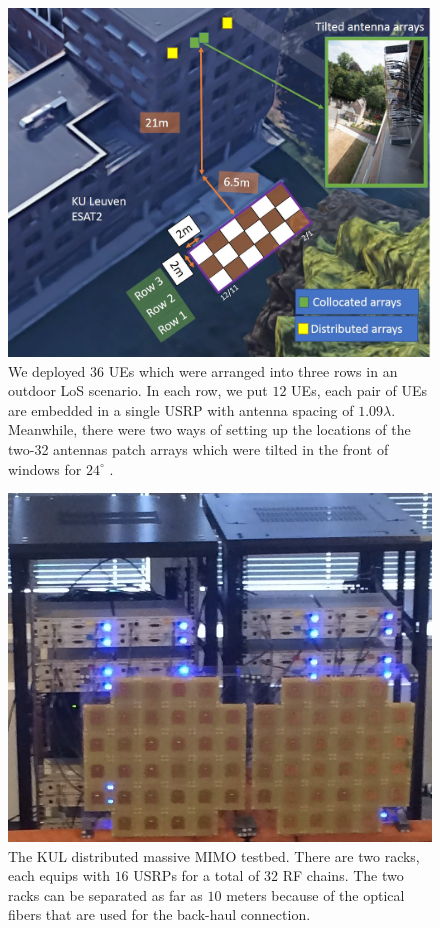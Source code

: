 \begin{figure}[t!]
	\centering
	\includegraphics[width=1.0\linewidth]{figures/outdoor_scenario.jpg}
	\caption{We deployed $36$ UEs which were arranged into three rows in an outdoor LoS scenario. In each row, we put $12$ UEs, each pair of UEs are embedded in a single USRP with antenna spacing of $1.09\lambda$. Meanwhile, there were two ways of setting up the locations of the two-32 antennas patch arrays which were tilted in the front of windows for $24^\circ$ .}
	\label{fig:The measured outdoor scenario}
\end{figure}
\begin{figure}[t!]
	\centering
	\includegraphics[width=1\linewidth]{figures/BSArrays.png}
	\caption{The KUL distributed massive MIMO testbed. There are two racks, each equips with $16$ USRPs for a total of $32$ RF chains. The two racks can be separated as far as $10$ meters because of the optical fibers that  are used for the back-haul connection.}
	\label{fig:BSArrays}
\end{figure}
